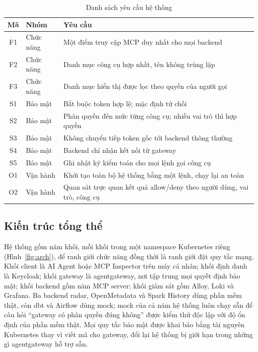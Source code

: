 \begin{table}[H]\centering\caption{Danh sách yêu cầu hệ thống}\label{tab:yeucau}
{\singlespacing\renewcommand{\arraystretch}{1.2}
\begin{tabularx}{\textwidth}{|c|p{2.6cm}|X|}\hline
\textbf{Mã} & \textbf{Nhóm} & \textbf{Yêu cầu} \\ \hline
F1 & Chức năng & Một điểm truy cập MCP duy nhất cho mọi backend \\ \hline
F2 & Chức năng & Danh mục công cụ hợp nhất, tên không trùng lặp \\ \hline
F3 & Chức năng & Danh mục hiển thị được lọc theo quyền của người gọi \\ \hline
S1 & Bảo mật & Bắt buộc token hợp lệ; mặc định từ chối \\ \hline
S2 & Bảo mật & Phân quyền đến mức từng công cụ; nhiều vai trò thì hợp quyền \\ \hline
S3 & Bảo mật & Không chuyển tiếp token gốc tới backend thông thường \\ \hline
S4 & Bảo mật & Backend chỉ nhận kết nối từ gateway \\ \hline
S5 & Bảo mật & Ghi nhật ký kiểm toán cho mọi lệnh gọi công cụ \\ \hline
O1 & Vận hành & Khởi tạo toàn bộ hệ thống bằng một lệnh, chạy lại an toàn \\ \hline
O2 & Vận hành & Quan sát trực quan kết quả allow/deny theo người dùng, vai trò, công cụ \\ \hline
\end{tabularx}}\end{table}

\subsection{Kiến trúc tổng thể}

Hệ thống gồm năm khối, mỗi khối trong một namespace Kubernetes riêng (Hình~\ref{fig:arch}), để ranh giới chức năng đồng thời là ranh giới đặt quy tắc mạng. Khối client là AI Agent hoặc MCP Inspector trên máy cá nhân; khối định danh là Keycloak; khối gateway là agentgateway, nơi tập trung mọi quyết định bảo mật; khối backend gồm năm MCP server; khối giám sát gồm Alloy, Loki và Grafana. Ba backend radar, OpenMetadata và Spark History dùng phần mềm thật, còn dbt và Airflow dùng mock; mock của cả năm hệ thống luôn chạy sẵn để câu hỏi ``gateway có phân quyền đúng không'' được kiểm thử độc lập với độ ổn định của phần mềm thật. Mọi quy tắc bảo mật được khai báo bằng tài nguyên Kubernetes thay vì viết mã cho gateway, đổi lại hệ thống bị giới hạn trong những gì agentgateway hỗ trợ sẵn.

